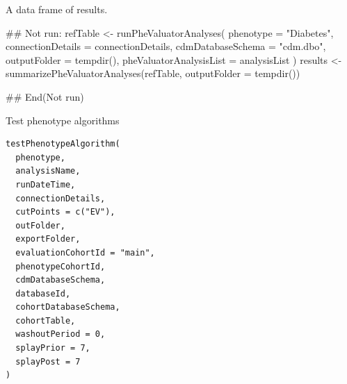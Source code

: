 \documentclass[a4paper]{book}
\begin{document}
%
\begin{Value}
A data frame of results.
\end{Value}
%
\begin{Examples}
\begin{ExampleCode}
## Not run: 
refTable <- runPheValuatorAnalyses(
  phenotype = "Diabetes",
  connectionDetails = connectionDetails,
  cdmDatabaseSchema = "cdm.dbo",
  outputFolder = tempdir(),
  pheValuatorAnalysisList = analysisList
)
results <- summarizePheValuatorAnalyses(refTable, outputFolder = tempdir())

## End(Not run)

\end{ExampleCode}
\end{Examples}
%
\begin{Description}
Test phenotype algorithms
\end{Description}
%
\begin{Usage}
\begin{verbatim}
testPhenotypeAlgorithm(
  phenotype,
  analysisName,
  runDateTime,
  connectionDetails,
  cutPoints = c("EV"),
  outFolder,
  exportFolder,
  evaluationCohortId = "main",
  phenotypeCohortId,
  cdmDatabaseSchema,
  databaseId,
  cohortDatabaseSchema,
  cohortTable,
  washoutPeriod = 0,
  splayPrior = 7,
  splayPost = 7
)
\end{verbatim}
\end{Usage}
%
\end{document}
